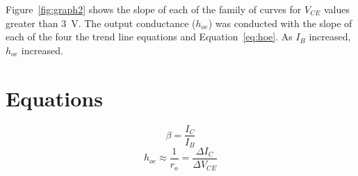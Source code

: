Figure~\ref{fig:graph2} shows the slope of each of the family of curves for $V_{CE}$ values greater than \SI{3}{V}.  The output conductance ($h_{oe}$) was conducted with the slope of each of the four the trend line equations and Equation~\ref{eq:hoe}.  As $I_B$ increased, $h_{oe}$ increased.   %

\section{Equations}

%
\begin{equation}
  \label{eq:beta}
  \beta = \frac{I_C}{I_B}
\end{equation}
%
\begin{equation}
  \label{eq:hoe}
  h_{oe} \approx \frac{1}{r_o} = \frac{\Delta I_C}{\Delta V_{CE}}
\end{equation}
%


